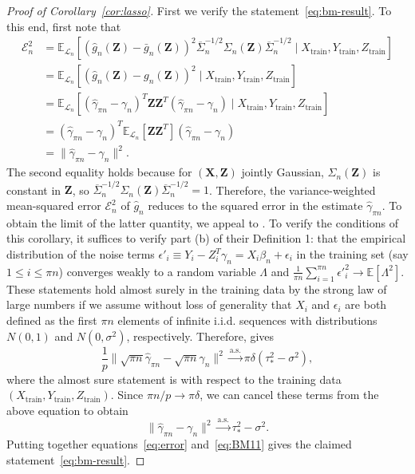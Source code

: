 \documentclass[ejs]{imsart}
\numberwithin{equation}{section}
\theoremstyle{plain}
\theoremstyle{definition}
\theoremstyle{remark}
\newcommand{\eps}{\epsilon}
\newcommand{\prx}{\bm X}
\newcommand{\srx}{X}
\newcommand{\prz}{\bm Z}
\newcommand{\srz}{Z}
\newcommand{\sry}{Y}
\newcommand{\seps}{\epsilon}
\begin{document}
\begin{proof}[Proof of Corollary~\ref{cor:lasso}]

First we verify the statement~\eqref{eq:bm-result}. To this end, first note that
\begin{equation}
	\begin{split}
		\mathcal E_n^2 &=  \mathbb E_{\mathcal L_n}[(\widehat g_n(\prz) - \bar g_n(\prz))^2\overline \Sigma_n^{-1/2}\Sigma_n(\prz)\overline \Sigma_n^{-1/2} \mid \srx_{\text{train}}, \sry_{\text{train}}, \srz_{\text{train}}] \\
		&= \mathbb E_{\mathcal L_n}[(\widehat g_n(\prz) - g_n(\prz))^2 \mid \srx_{\text{train}}, \sry_{\text{train}}, \srz_{\text{train}}] \\
		&= \mathbb E_{\mathcal L_n}[(\widehat \gamma_{\pi n} - \gamma_n)^T \prz \prz^T (\widehat \gamma_{\pi n} - \gamma_n) \mid \srx_{\text{train}}, \sry_{\text{train}}, \srz_{\text{train}}] \\
		&= (\widehat \gamma_{\pi n} - \gamma_n)^T\mathbb E_{\mathcal L_n}[ \prz \prz^T](\widehat \gamma_{\pi n} - \gamma_n) \\
		&= \|\widehat \gamma_{\pi n} - \gamma_n\|^2.
		\label{eq:error}
	\end{split}
\end{equation}
The second equality holds because for $(\prx, \prz)$ jointly Gaussian, $\Sigma_n(\prz)$ is constant in $\prz$, so $\overline \Sigma_n^{-1/2}\Sigma_n(\prz)\overline \Sigma_n^{-1/2} = 1$.
Therefore, the variance-weighted mean-squared error $\mathcal E_n^2$ of $\widehat g_n$ reduces to the squared error in the estimate $\widehat \gamma_{\pi n}$. To obtain the limit of the latter quantity, we appeal to \citet[Corollary 1.6]{Bayati2011}. To verify the conditions of this corollary, it suffices to verify part (b) of their Definition 1: that the empirical distribution of the noise terms $\seps'_i \equiv \sry_i - \srz_i^T \gamma_n = \srx_i \beta_n + \seps_i$ in the training set (say $1 \leq i \leq \pi n$) converges weakly to a random variable $\Lambda$ and $\frac{1}{\pi n}\sum_{i = 1}^{\pi n} \eps'^2_i \rightarrow \mathbb E[\Lambda^2]$. These statements hold almost surely in the training data by the strong law of large numbers if we assume without loss of generality that $\srx_i$ and $\seps_i$ are both defined as the first $\pi n$ elements of infinite i.i.d. sequences with distributions $N(0,1)$ and $N(0,\sigma^2)$, respectively. Therefore, \citet[Corollary 1.6]{Bayati2011} gives
\begin{equation}
	\frac{1}{p}\|\sqrt{\pi n}\widehat \gamma_{\pi n} - \sqrt{\pi n}\gamma_n\|^2 \overset{\text{a.s.}}\rightarrow \pi\delta(\tau_*^2 - \sigma^2),
\end{equation}
where the almost sure statement is with respect to the training data $(\srx_{\text{train}}, \sry_{\text{train}}, \srz_{\text{train}})$. Since $\pi n/p \rightarrow \pi \delta$, we can cancel these terms from the above equation to obtain
\begin{equation}
	\|\widehat \gamma_{\pi n} - \gamma_n\|^2 \overset{\text{a.s.}}\rightarrow \tau_*^2 - \sigma^2.
	\label{eq:BM11}
\end{equation}
Putting together equations~\eqref{eq:error} and~\eqref{eq:BM11} gives the claimed statement~\eqref{eq:bm-result}. 


\end{proof}
\end{document}
